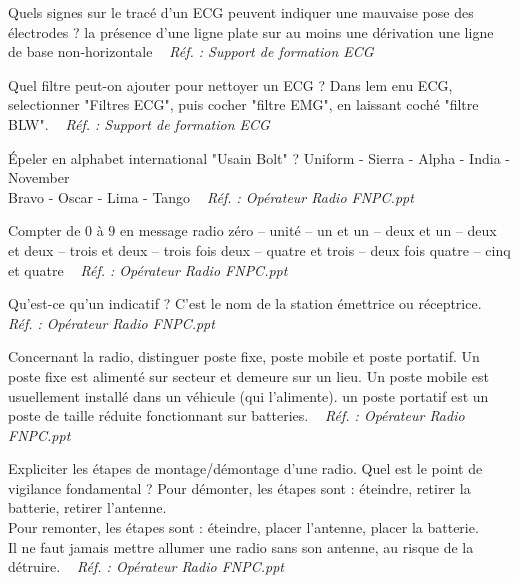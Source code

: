 \documentclass[grid,avery5371,landscape]{flashcards}
\makeatletter
\newcounter{nocarte}
\newcommand{\categ}[1]{%
  \def\@categ{#1}%
  \setcounter{nocarte}{0}%
}
\newcommand{\source}[1]{%
  \medskip
  \itshape%
   ~ \hfill Réf. : #1}
\makeatother
\begin{document}
\color[HTML]{FF6D01}
\categ{PSE+}
\begin{flashcard}[geste]{
 Quels signes sur le tracé d'un ECG peuvent indiquer une mauvaise pose des électrodes ?   }
  la présence d'une ligne plate sur au moins une dérivation
une ligne de base non-horizontale
  \source{Support de formation ECG}
\end{flashcard}


\color[HTML]{FF6D01}
\categ{PSE+}
\begin{flashcard}[geste]{
 Quel filtre peut-on ajouter pour nettoyer un ECG ?   }
  Dans lem enu ECG, selectionner "Filtres ECG", puis cocher "filtre EMG", en laissant coché "filtre BLW".
  \source{Support de formation ECG}
\end{flashcard}


\color[HTML]{01DFA5}
\categ{TECH}
\begin{flashcard}[radio]{
 Épeler en alphabet international "Usain Bolt" ?   }
  Uniform - Sierra - Alpha - India - November \\ Bravo - Oscar - Lima - Tango
  \source{Opérateur Radio FNPC.ppt}
\end{flashcard}


\color[HTML]{01DFA5}
\categ{TECH}
\begin{flashcard}[radio]{
 Compter de $0$ à $9$ en message radio   }
   zéro -- unité -- un et un -- deux et un -- deux et deux -- trois et deux -- trois fois deux -- quatre et trois -- deux fois quatre -- cinq et quatre
  \source{Opérateur Radio FNPC.ppt}
\end{flashcard}


\color[HTML]{01DFA5}
\categ{TECH}
\begin{flashcard}[radio]{
 Qu'est-ce qu'un indicatif ?   }
  C'est le nom de la station émettrice ou réceptrice.
  \source{Opérateur Radio FNPC.ppt}
\end{flashcard}


\color[HTML]{01DFA5}
\categ{TECH}
\begin{flashcard}[radio]{
 Concernant la radio, distinguer poste fixe, poste mobile et poste portatif.   }
  Un poste fixe est alimenté sur secteur et demeure sur un lieu. Un poste mobile est usuellement installé dans un véhicule (qui l'alimente). un poste portatif est un poste de taille réduite fonctionnant sur batteries.
  \source{Opérateur Radio FNPC.ppt}
\end{flashcard}


\color[HTML]{01DFA5}
\categ{TECH}
\begin{flashcard}[radio]{
 Expliciter les étapes de montage/démontage d'une radio. Quel est le point de vigilance fondamental ?   }
  Pour démonter, les étapes sont : éteindre, retirer la batterie, retirer l'antenne. \\ 
Pour remonter, les étapes sont : éteindre, placer l'antenne, placer la batterie. \\
Il ne faut jamais mettre allumer une radio sans son antenne, au risque de la détruire.
  \source{Opérateur Radio FNPC.ppt}
\end{flashcard}
\end{document}

